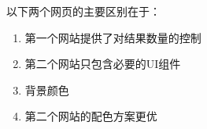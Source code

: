 \begin{problem}
	以下两个网页的主要区别在于：
\begin{figure}[H]
	\setcounter{subfigure}{0}
	\centering
	\vspace{-0.5em}	
    \hfill
	\vspace{-3em}
\end{figure}
    \vspace{-0.8em}
    \begin{multicols}{2}
        \begin{enumerate}[label=\Alph*.]
            \item 第一个网站提供了对结果数量的控制
            \item 第二个网站只包含必要的UI组件
            \item 背景颜色
            \item 第二个网站的配色方案更优
        \end{enumerate}
    \end{multicols}
    \vspace{-1em}
\end{problem}


